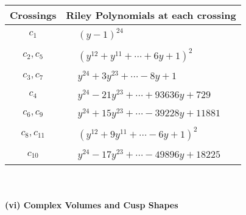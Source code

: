 \documentclass[1p]{elsarticle_modified}
\theoremstyle{definition}
\begin{document}
\begin{tabular}{m{50pt}|m{274pt}}
Crossings & \hspace{64pt}Riley Polynomials at each crossing \\
\hline $$\begin{aligned}c_{1}\end{aligned}$$&$\begin{aligned}
&(y-1)^{24}
\end{aligned}$\\
\hline $$\begin{aligned}c_{2},c_{5}\end{aligned}$$&$\begin{aligned}
&(y^{12}+y^{11}+\cdots+6 y+1)^{2}
\end{aligned}$\\
\hline $$\begin{aligned}c_{3},c_{7}\end{aligned}$$&$\begin{aligned}
&y^{24}+3 y^{23}+\cdots-8 y+1
\end{aligned}$\\
\hline $$\begin{aligned}c_{4}\end{aligned}$$&$\begin{aligned}
&y^{24}-21 y^{23}+\cdots+93636 y+729
\end{aligned}$\\
\hline $$\begin{aligned}c_{6},c_{9}\end{aligned}$$&$\begin{aligned}
&y^{24}+15 y^{23}+\cdots-39228 y+11881
\end{aligned}$\\
\hline $$\begin{aligned}c_{8},c_{11}\end{aligned}$$&$\begin{aligned}
&(y^{12}+9 y^{11}+\cdots-6 y+1)^{2}
\end{aligned}$\\
\hline $$\begin{aligned}c_{10}\end{aligned}$$&$\begin{aligned}
&y^{24}-17 y^{23}+\cdots-49896 y+18225
\end{aligned}$\\
\hline
\end{tabular}\\~\\
\newpage\flushleft \textbf{(vi) Complex Volumes and Cusp Shapes}
\end{document}
